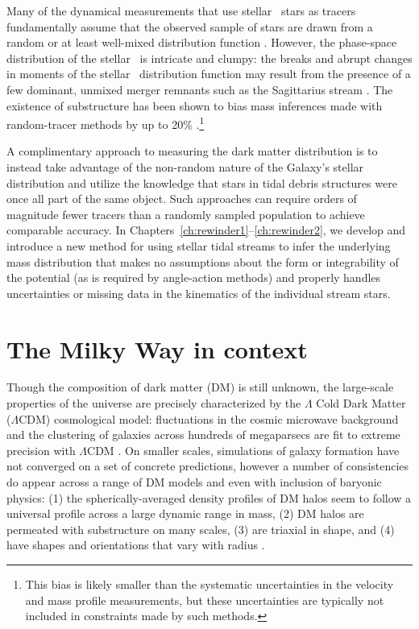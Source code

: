 Many of the dynamical measurements that use stellar \mwhalo\ stars as tracers
fundamentally assume that the observed sample of stars are drawn from a random
or at least well-mixed distribution function \citep[e.g.,][]{battaglia05,
kafle12, kafle14}. However, the phase-space distribution of the stellar \mwhalo\
is intricate and clumpy: the breaks and abrupt changes in moments of the stellar
\mwhalo\ distribution function may result from the presence of a few dominant,
unmixed merger remnants such as the Sagittarius stream \citep[which contains
almost as much stellar mass as the rest of the stellar \mwhalo\
combined;][]{niedersteostholt10}. The existence of substructure has been shown
to bias mass inferences made with random-tracer methods by up to 20\%
\citep{yencho06}.\footnote{This bias is likely smaller than the systematic
uncertainties in the velocity and mass profile measurements, but these
uncertainties are typically not included in constraints made by such methods.}

A complimentary approach to measuring the dark matter distribution is to instead
take advantage of the non-random nature of the Galaxy's stellar distribution and
utilize the knowledge that stars in tidal debris structures were once all part
of the same object. Such approaches can require orders of magnitude fewer
tracers than a randomly sampled population to achieve comparable accuracy. In
Chapters~\ref{ch:rewinder1}--\ref{ch:rewinder2}, we develop and introduce a new
method for using stellar tidal streams to infer the underlying mass distribution
that makes no assumptions about the form or integrability of the potential (as
is required by angle-action methods) and properly handles uncertainties or
missing data in the kinematics of the individual stream stars.

\section{The Milky Way in context} \label{sec:mw-context}

Though the composition of dark matter (DM) is still unknown, the large-scale
properties of the universe are precisely characterized by the $\Lambda$ Cold
Dark Matter ($\Lambda$CDM) cosmological model: fluctuations in the cosmic
microwave background and the clustering of galaxies across hundreds of
megaparsecs are fit to extreme precision with $\Lambda$CDM \citep{planck15,
sanchez12}. On smaller scales, simulations of galaxy formation have not
converged on a set of concrete predictions, however a number of consistencies do
appear across a range of DM models and even with inclusion of baryonic physics:
(1) the spherically-averaged density profiles of DM halos seem to follow a
universal profile across a large dynamic range in mass, (2) DM halos are
permeated with substructure on many scales, (3) are triaxial in shape, and (4)
have shapes and orientations that vary with radius \citep{dubinski91, navarro96,
jing02, kuhlen07, veraciro11}.

